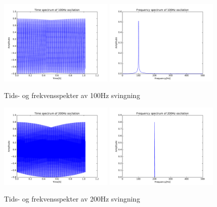 \documentclass[12p,a4paper]{article}
\begin{document}
\begin{figure}[H]
\centering
\includegraphics[width=0.49\textwidth]{fig/timespec100.pdf}
\includegraphics[width=0.49\textwidth]{fig/freqspec100.pdf}
\caption{Tids- og frekvensspekter av 100Hz svingning}
\label{fig:100Hz}
\end{figure}
\begin{figure}[H]
\centering
\includegraphics[width=0.49\textwidth]{fig/timespec200.pdf}
\includegraphics[width=0.49\textwidth]{fig/freqspec200.pdf}
\caption{Tids- og frekvensspekter av 200Hz svingning}
\end{figure}
\end{document}
